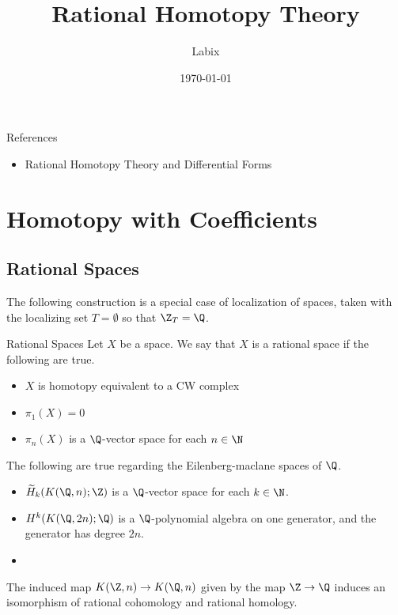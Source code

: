 \documentclass[a4paper]{article}
\title{Rational Homotopy Theory}
\author{Labix}
\date{\today}
\begin{document}
\maketitle
\begin{abstract}
\end{abstract}
References
\begin{itemize}
\item Rational Homotopy Theory and Differential Forms
\end{itemize}
\pagebreak
\tableofcontents

\pagebreak
\section{Homotopy with Coefficients}
\subsection{Rational Spaces}
The following construction is a special case of localization of spaces, taken with the localizing set $T=\emptyset$ so that $\Z_T=\Q$. 

\begin{defn}{Rational Spaces}{} Let $X$ be a space. We say that $X$ is a rational space if the following are true. 
\begin{itemize}
\item $X$ is homotopy equivalent to a CW complex
\item $\pi_1(X)=0$
\item $\pi_n(X)$ is a $\Q$-vector space for each $n\in\N$
\end{itemize}
\end{defn}

\begin{lmm}{}{} The following are true regarding the Eilenberg-maclane spaces of $\Q$. 
\begin{itemize}
\item $\widetilde{H}_k(K(\Q,n);\Z)$ is a $\Q$-vector space for each $k\in\N$. 
\item $H^k(K(\Q,2n);\Q)$ is a $\Q$-polynomial algebra on one generator, and the generator has degree $2n$. 
\item 
\end{itemize}
\end{lmm}

\begin{crl}{}{} The induced map $K(\Z,n)\to K(\Q,n)$ given by the map $\Z\to\Q$ induces an isomorphism of rational cohomology and rational homology. 
\end{crl}
\end{document}
